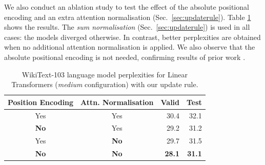 \documentclass{article}
\theoremstyle{definition}
\begin{document}
We also conduct an ablation study to test the effect of
the absolute positional encoding and an extra attention normalisation (Sec.~\ref{sec:updaterule}).
Table \ref{tab:lm-ablation} shows the results.
The \textit{sum normalisation} (Sec.~\ref{sec:updaterule}) is
used in all cases: the models diverged otherwise.
In contrast, better perplexities are obtained when no additional attention normalisation
is applied.
We also observe that the absolute positional encoding is not needed,
confirming results of prior work \citep{irie19:trafolm}.

\begin{table}[h]
\caption{
WikiText-103 language model perplexities
for Linear Transformers (\textit{medium} configuration) with our update rule.
}

\label{tab:lm-ablation}
\vskip 0.15in
\begin{center}
\begin{small}
\begin{tabular}{ccrr}
\toprule
Position Encoding  & Attn. Normalisation  & Valid & Test \\ \midrule
Yes  & Yes   &  30.4   &  32.1   \\ 
\textbf{No}   & Yes   &  29.2   &  31.2   \\ 
Yes  &  \textbf{No}   &  29.7   &  31.5  \\ 
\textbf{No}   &  \textbf{No}   &  \textbf{28.1}   &  \textbf{31.1} \\
\bottomrule
\end{tabular}
\end{small}
\end{center}
\vskip -0.2in



\end{table}
\end{document}
